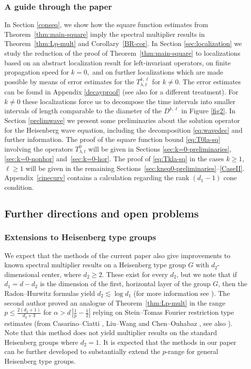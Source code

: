 \documentclass[leqno]{amsart}
\theoremstyle{definition}
\theoremstyle{remark}
\numberwithin{equation}{section}
\newcommand\lc{\lesssim}
\newcommand\la{{\lambda}}
\begin{document}
\subsubsection*{A guide through the paper} 
In Section \ref{conseq}, we  show how the square function estimates from Theorem~\ref{thm:main-square} imply the   spectral multiplier results in Theorem~\ref{thm:Lp-mult} and Corollary~\ref{BR-cor}.
In Section \ref{sec:localization} we study the reduction of the proof of Theorem~\ref{thm:main-square} to  localizations based on an abstract localization result for left-invariant operators, on finite propagation speed for $k=0,$ and on further localizations which are made possible by means of  error estimates for the $T^{k,\ell}_{\la,t}$ for $k\ne 0$. The error estimates can be found in Appendix \ref{decayproof} (see also \cite{MuellerSeeger2015} for a different treatment).
For $k\neq 0$ these localizations force us to decompose the time intervals into smaller intervals of length comparable to the diameter of the $D^{k,\ell}$ in Figure \ref{fig2}.
In Section \ref{prelimwave} we present some preliminaries about the solution operator for the Heisenberg wave equation, including the decomposition \eqref{eq:wavedec} and further information. The proof of the square function bound \eqref{eq:T0la-sq} involving the operators $T^0_{\la,t}$ will be given in Sections \ref{sec:k=0-preliminaries}, \ref{sec:k=0-nonhor} and~\ref{sec:k=0-hor}. 
The proof of \eqref{eq:Tkla-sq} in the cases $k\ge 1$, $\ell\ge 1$ will be given in the remaining Sections~\ref{sec:kneq0-preliminaries}--\ref{CaseII}. Appendix~\ref{cinecurv} contains a calculation regarding the rank $(d_1-1)$ cone condition. 


\subsection*{Further directions and open problems} 

\subsubsection*{Extensions to Heisenberg type groups}
We expect that the methods of the current paper also give improvements to known spectral multiplier results on a  Heisenberg type group $G$  with $d_2$-dimensional  center, where $d_2\ge 2$.  These exist for every $d_2$, but we note  that  if $d_1=d-d_2$ is the dimension of the first, horizontal layer of the group $G$, then  the Radon--Hurwitz formulas yield  $d_2\lc \log d_1$ (for more information see \cite{AdamsLaxPhillips, Kaplan1980}). The second author \cite{Ni24} proved an analogue of Theorem~\ref{thm:Lp-mult} in the range $p\le \frac{2(d_2+1)}{d_2+3}$ for $\alpha>d\,|\frac 1p-\frac 12|$ relying on Stein--Tomas  Fourier restriction type estimates (from Casarino--Ciatti \cite{CasarinoCiatti}, Liu--Wang \cite{LiuHeping-WangYingzhan} and Chen--Ouhabaz \cite{ChenOuhabaz}, see also \cite{Ni23-restr}). Note that this method does not yield multiplier results on the standard Heisenberg groups where $d_2=1$.  It is expected that the methods in our  paper can be further developed to substantially extend the  $p$-range for general Heisenberg type groups.
\end{document}
